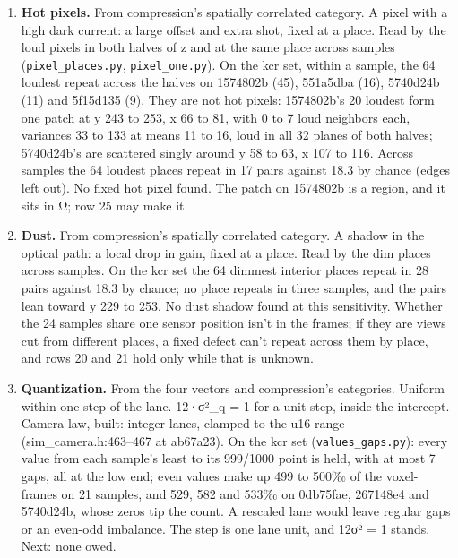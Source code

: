 \begin{enumerate}
\begin{itemize}
\item Prior art, cited from knowledge. DSNU and PRNU as the spatial variance of the dark and of the gain, read from frame averages at several levels: EMVA Standard 1288, “Standard for Characterization of Image Sensors and Cameras”, European Machine Vision Association (rows 18 and 19).
\end{itemize}
\item \textbf{Hot pixels.} From compression's spatially correlated category. A pixel with a high dark current: a large offset and extra shot, fixed at a place. Read by the loud pixels in both halves of z and at the same place across samples (\texttt{pixel\_\allowbreak{}places.\allowbreak{}py}, \texttt{pixel\_\allowbreak{}one.\allowbreak{}py}). On the kcr set, within a sample, the 64 loudest repeat across the halves on 1574802b (45), 551a5dba (16), 5740d24b (11) and 5f15d135 (9). They are not hot pixels: 1574802b's 20 loudest form one patch at y 243 to 253, x 66 to 81, with 0 to 7 loud neighbors each, variances 33 to 133 at means 11 to 16, loud in all 32 planes of both halves; 5740d24b's are scattered singly around y 58 to 63, x 107 to 116. Across samples the 64 loudest places repeat in 17 pairs against 18.3 by chance (edges left out). No fixed hot pixel found. The patch on 1574802b is a region, and it sits in Ω; row 25 may make it.
\item \textbf{Dust.} From compression's spatially correlated category. A shadow in the optical path: a local drop in gain, fixed at a place. Read by the dim places across samples. On the kcr set the 64 dimmest interior places repeat in 28 pairs against 18.3 by chance; no place repeats in three samples, and the pairs lean toward y 229 to 253. No dust shadow found at this sensitivity. Whether the 24 samples share one sensor position isn't in the frames; if they are views cut from different places, a fixed defect can't repeat across them by place, and rows 20 and 21 hold only while that is unknown.
\item \textbf{Quantization.} From the four vectors and compression's categories. Uniform within one step of the lane. 12·σ²\_\allowbreak{}q = 1 for a unit step, inside the intercept. Camera law, built: integer lanes, clamped to the u16 range (sim\_\allowbreak{}camera.h:463–467 at ab67a23). On the kcr set (\texttt{values\_\allowbreak{}gaps.\allowbreak{}py}): every value from each sample's least to its 999/1000 point is held, with at most 7 gaps, all at the low end; even values make up 499 to 500‰ of the voxel-frames on 21 samples, and 529, 582 and 533‰ on 0db75fae, 267148e4 and 5740d24b, whose zeros tip the count. A rescaled lane would leave regular gaps or an even-odd imbalance. The step is one lane unit, and 12σ² = 1 stands. Next: none owed.

\end{enumerate}
